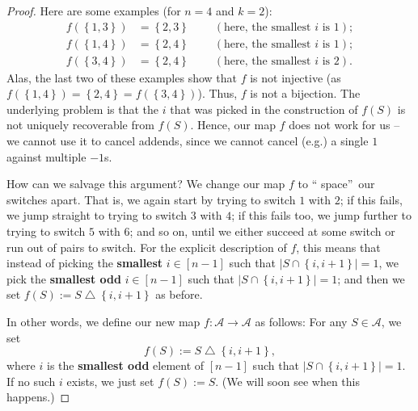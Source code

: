 \begin{proof}
Here are some examples (for $n=4$ and $k=2$):%
\begin{align*}
f\left(  \left\{  1,3\right\}  \right)   &  =\left\{  2,3\right\}
\ \ \ \ \ \ \ \ \ \ \left(  \text{here, the smallest }i\text{ is }1\right)
;\\
f\left(  \left\{  1,4\right\}  \right)   &  =\left\{  2,4\right\}
\ \ \ \ \ \ \ \ \ \ \left(  \text{here, the smallest }i\text{ is }1\right)
;\\
f\left(  \left\{  3,4\right\}  \right)   &  =\left\{  2,4\right\}
\ \ \ \ \ \ \ \ \ \ \left(  \text{here, the smallest }i\text{ is }2\right)  .
\end{align*}
Alas, the last two of these examples show that $f$ is not injective (as
$f\left(  \left\{  1,4\right\}  \right)  =\left\{  2,4\right\}  =f\left(
\left\{  3,4\right\}  \right)  $). Thus, $f$ is not a bijection. The
underlying problem is that the $i$ that was picked in the construction of
$f\left(  S\right)  $ is not uniquely recoverable from $f\left(  S\right)  $.
Hence, our map $f$ does not work for us -- we cannot use it to cancel addends,
since we cannot cancel (e.g.) a single $1$ against multiple $-1$s.

How can we salvage this argument? We change our map $f$ to \textquotedblleft
space\textquotedblright\ our switches apart. That is, we again start by trying
to switch $1$ with $2$; if this fails, we jump straight to trying to switch
$3$ with $4$; if this fails too, we jump further to trying to switch $5$ with
$6$; and so on, until we either succeed at some switch or run out of pairs to
switch. For the explicit description of $f$, this means that instead of
picking the \textbf{smallest} $i\in\left[  n-1\right]  $ such that $\left\vert
S\cap\left\{  i,i+1\right\}  \right\vert =1$, we pick the \textbf{smallest
odd} $i\in\left[  n-1\right]  $ such that $\left\vert S\cap\left\{
i,i+1\right\}  \right\vert =1$; and then we set $f\left(  S\right)
:=S\bigtriangleup\left\{  i,i+1\right\}  $ as before.

In other words, we define our new map $f:\mathcal{A}\rightarrow\mathcal{A}$ as
follows: For any $S\in\mathcal{A}$, we set%
\[
f\left(  S\right)  :=S\bigtriangleup\left\{  i,i+1\right\}  ,
\]
where $i$ is the \textbf{smallest odd} element of $\left[  n-1\right]  $ such
that $\left\vert S\cap\left\{  i,i+1\right\}  \right\vert =1$. If no such $i$
exists, we just set $f\left(  S\right)  :=S$. (We will soon see when this happens.)


\end{proof}
